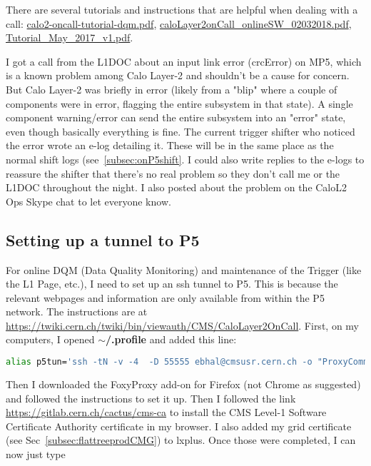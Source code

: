 There are several tutorials and instructions that are helpful when dealing with a call: \href{run:./sec33/calo2-oncall-tutorial-dqm.pdf}{calo2-oncall-tutorial-dqm.pdf}, \href{run:./sec33/caloLayer2onCall_onlineSW_02032018.pdf}{caloLayer2onCall\_onlineSW\_02032018.pdf}, \href{run:./sec33/Tutorial_May_2017_v1.pdf}{Tutorial\_May\_2017\_v1.pdf}.

I got a call from the L1DOC about an input link error (crcError) on MP5, which is a known problem among Calo Layer-2 and shouldn't be a cause for concern. But Calo Layer-2 was briefly in error (likely from a "blip" where a couple of components were in error, flagging the entire subsystem in that state). A single component warning/error can send the entire subsystem into an "error" state, even though basically everything is fine. The current trigger shifter who noticed the error wrote an e-log detailing it. These will be in the same place as the normal shift logs (see~\ref{subsec:onP5shift}. I could also write replies to the e-logs to reassure the shifter that there's no real problem so they don't call me or the L1DOC throughout the night. I also posted about the problem on the CaloL2 Ops Skype chat to let everyone know.


\subsection{Setting up a tunnel to P5}

For online DQM (Data Quality Monitoring) and maintenance of the Trigger (like the L1 Page, etc.), I need to set up an ssh tunnel to P5. This is because the relevant webpages and information are only available from within the P5 network. The instructions are at \url{https://twiki.cern.ch/twiki/bin/viewauth/CMS/CaloLayer2OnCall}. First, on my computers, I opened \textbf{$\sim$/.profile} and added this line:

\begin{lstlisting}[belowskip=-0.7cm, language=sh, numbers=none]
alias p5tun='ssh -tN -v -4  -D 55555 ebhal@cmsusr.cern.ch -o "ProxyCommand=ssh ebhal@lxplus.cern.ch -W %h:%p"'
\end{lstlisting}

Then I downloaded the FoxyProxy add-on for Firefox (not Chrome as suggested) and followed the instructions to set it up. Then I followed the link \url{https://gitlab.cern.ch/cactus/cms-ca} to install the CMS Level-1 Software Certificate Authority certificate in my browser. I also added my grid certificate (see Sec~\ref{subsec:flattreeprodCMG}) to lxplus. Once those were completed, I can now just type

